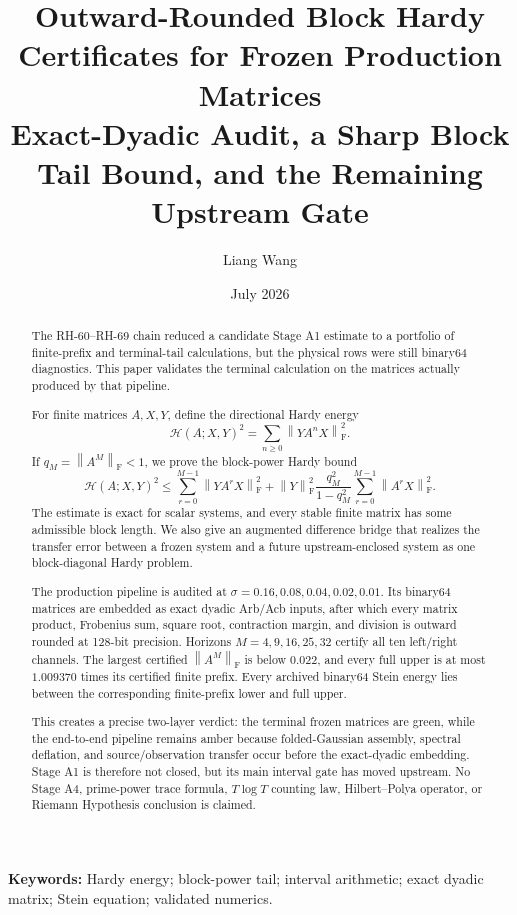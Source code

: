 \documentclass[11pt]{article}
\title{Outward-Rounded Block Hardy Certificates for Frozen Production Matrices\\
\large Exact-Dyadic Audit, a Sharp Block Tail Bound, and the Remaining Upstream Gate}
\author{Liang Wang}
\date{July 2026}
\theoremstyle{definition}
\newcommand{\norm}[1]{\left\lVert#1\right\rVert}
\newcommand{\F}{\mathrm F}
\newcommand{\HH}{\mathcal H}
\begin{document}
\maketitle

\begin{abstract}
The RH-60--RH-69 chain reduced a candidate Stage A1 estimate to a portfolio
of finite-prefix and terminal-tail calculations, but the physical rows were
still binary64 diagnostics.  This paper validates the terminal calculation
on the matrices actually produced by that pipeline.

For finite matrices $A,X,Y$, define the directional Hardy energy
\[
 \HH(A;X,Y)^2=\sum_{n\ge0}\norm{YA^nX}_{\F}^2.
\]
If $q_M=\norm{A^M}_{\F}<1$, we prove the block-power Hardy bound
\[
 \HH(A;X,Y)^2\le
 \sum_{r=0}^{M-1}\norm{YA^rX}_{\F}^2
 +\norm{Y}_{\F}^2\frac{q_M^2}{1-q_M^2}
  \sum_{r=0}^{M-1}\norm{A^rX}_{\F}^2.
\]
The estimate is exact for scalar systems, and every stable finite matrix has
some admissible block length.  We also give an augmented difference bridge
that realizes the transfer error between a frozen system and a future
upstream-enclosed system as one block-diagonal Hardy problem.

The production pipeline is audited at
$\sigma=0.16,0.08,0.04,0.02,0.01$.  Its binary64 matrices are embedded as
exact dyadic Arb/Acb inputs, after which every matrix product, Frobenius sum,
square root, contraction margin, and division is outward rounded at 128-bit
precision.  Horizons $M=4,9,16,25,32$ certify all ten left/right channels.
The largest certified $\norm{A^M}_{\F}$ is below $0.022$, and every full
upper is at most $1.009370$ times its certified finite prefix.  Every archived
binary64 Stein energy lies between the corresponding finite-prefix lower and
full upper.

This creates a precise two-layer verdict: the terminal frozen matrices are
green, while the end-to-end pipeline remains amber because folded-Gaussian
assembly, spectral deflation, and source/observation transfer occur before
the exact-dyadic embedding.  Stage A1 is therefore not closed, but its main
interval gate has moved upstream.  No Stage A4, prime-power trace formula,
$T\log T$ counting law, Hilbert--Polya operator, or Riemann Hypothesis
conclusion is claimed.
\end{abstract}

\noindent\textbf{Keywords:} Hardy energy; block-power tail; interval
arithmetic; exact dyadic matrix; Stein equation; validated numerics.
\end{document}

